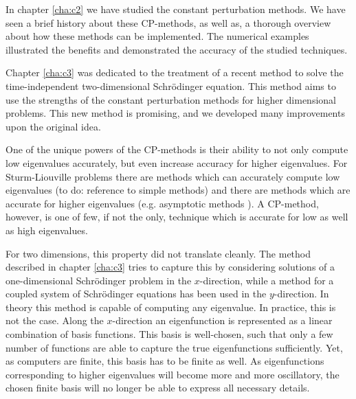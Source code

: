 

\label{cha:c4}

In chapter \ref{cha:c2} we have studied the constant perturbation methods. We have seen a brief history about these CP-methods, as well as, a thorough overview about how these methods can be implemented. The numerical examples illustrated the benefits and demonstrated the accuracy of the studied techniques.

Chapter \ref{cha:c3} was dedicated to the treatment of a recent method to solve the time-independent two-dimensional Schrödinger equation. This method aims to use the strengths of the constant perturbation methods for higher dimensional problems. This new method is promising, and we developed many improvements upon the original idea.

One of the unique powers of the CP-methods is their ability to not only compute low eigenvalues accurately, but even increase accuracy for higher eigenvalues. For Sturm-Liouville problems there are methods which can accurately compute low eigenvalues ({\color{red}to do: reference to simple methods}) and there are methods which are accurate for higher eigenvalues (e.g. asymptotic methods \cite{kuzmina_asymptotic_2000,zhukova_asymptotic_2020}). A CP-method, however, is one of few, if not the only, technique which is accurate for low as well as high eigenvalues.

For two dimensions, this property did not translate cleanly. The method described in chapter \ref{cha:c3} tries to capture this by considering solutions of a one-dimensional Schrödinger problem in the $x$-direction, while a method for a coupled system of Schrödinger equations has been used in the $y$-direction. In theory this method is capable of computing any eigenvalue. In practice, this is not the case. Along the $x$-direction an eigenfunction is represented as a linear combination of basis functions. This basis is well-chosen, such that only a few number of functions are able to capture the true eigenfunctions sufficiently. Yet, as computers are finite, this basis has to be finite as well. As eigenfunctions corresponding to higher eigenvalues will become more and more oscillatory, the chosen finite basis will no longer be able to express all necessary details.

